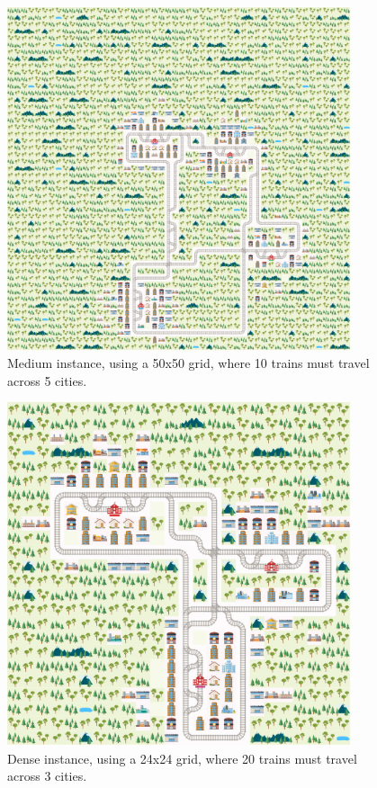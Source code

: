 \documentclass[runningheads]{llncs}
\begin{document}
\begin{figure}[h]
	
	\centering
	\includegraphics[width=0.9\textwidth]{medium/medium_0_1}
	\caption{Medium instance, using a 50x50 grid, where 10 trains must travel across 5 cities.}
	\label{medium_0_1_fullpage}
\end{figure}


\begin{figure}[h]
	
	\centering
	\includegraphics[width=0.9\textwidth]{dense/dense_0_1}
	\caption{Dense instance, using a 24x24 grid, where 20 trains must travel across 3 cities.}
	\label{dense_0_1_fullpage}
\end{figure}
\end{document}
